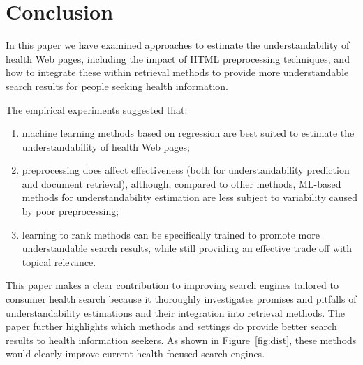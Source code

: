 \section{Conclusion}
\label{sec:conclusion_doc_analysis}

In this paper we have examined approaches to estimate the understandability of health Web pages, including the impact of HTML preprocessing techniques, and how to integrate these within retrieval methods to provide more understandable search results for people seeking health information. 


The empirical experiments suggested that:

\vspace{-4pt}
\begin{enumerate}[leftmargin=*]
	\item machine learning methods based on regression are best suited to estimate the understandability of health Web pages;
	\item preprocessing does affect effectiveness (both for understandability prediction and document retrieval), although, compared to other methods, ML-based methods for understandability estimation are less subject to variability caused by poor preprocessing;
	\item learning to rank methods can be specifically trained to promote more understandable search results, while still providing an effective trade off with topical relevance.
\end{enumerate} 

This paper makes a clear contribution to improving search engines tailored to consumer health search because it thoroughly investigates promises and pitfalls of understandability estimations and their integration into retrieval methods. The paper further highlights which methods and settings do provide better search results to health information seekers. As shown in Figure~\ref{fig:dist}, these methods would clearly improve current health-focused search engines. 


